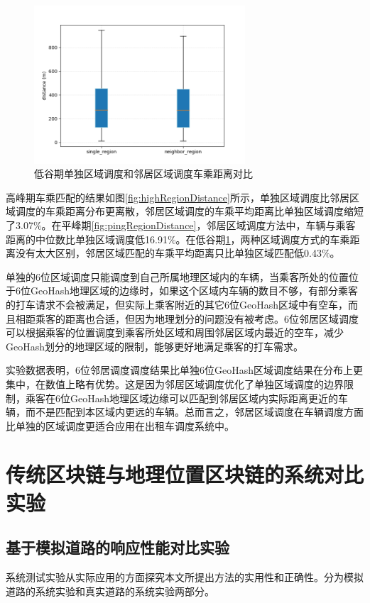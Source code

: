\begin{figure}[h]
  \centering
  \includegraphics[height=0.25\textheight,width=0.7\textwidth]{figures/低谷车乘匹配}
  \caption{低谷期单独区域调度和邻居区域调度车乘距离对比}\label{fig:shaoRegionDistance}
\end{figure}

高峰期车乘匹配的结果如图\ref{fig:highRegionDistance}所示，单独区域调度比邻居区域调度的车乘距离分布更离散，邻居区域调度的车乘平均距离比单独区域调度缩短了3.07$\%$。在平峰期\ref{fig:pingRegionDistance}，邻居区域调度方法中，车辆与乘客距离的中位数比单独区域调度低16.91$\%$。在低谷期\ref{fig:shaoRegionDistance}，两种区域调度方式的车乘距离没有太大区别，邻居区域匹配的车乘平均距离只比单独区域匹配低0.43$\%$。

单独的6位区域调度只能调度到自己所属地理区域内的车辆，当乘客所处的位置位于6位GeoHash地理区域的边缘时，如果这个区域内车辆的数目不够，有部分乘客的打车请求不会被满足，但实际上乘客附近的其它6位GeoHash区域中有空车，而且相距乘客的距离也合适，但因为地理划分的问题没有被考虑。6位邻居区域调度可以根据乘客的位置调度到乘客所处区域和周围邻居区域内最近的空车，减少GeoHash划分的地理区域的限制，能够更好地满足乘客的打车需求。

实验数据表明，6位邻居调度调度结果比单独6位GeoHash区域调度结果在分布上更集中，在数值上略有优势。这是因为邻居区域调度优化了单独区域调度的边界限制，乘客在6位GeoHash地理区域边缘可以匹配到邻居区域内实际距离更近的车辆，而不是匹配到本区域内更远的车辆。总而言之，邻居区域调度在车辆调度方面比单独的区域调度更适合应用在出租车调度系统中。

\section{传统区块链与地理位置区块链的系统对比实验}
\subsection{基于模拟道路的响应性能对比实验}
系统测试实验从实际应用的方面探究本文所提出方法的实用性和正确性。分为模拟道路的系统实验和真实道路的系统实验两部分。

